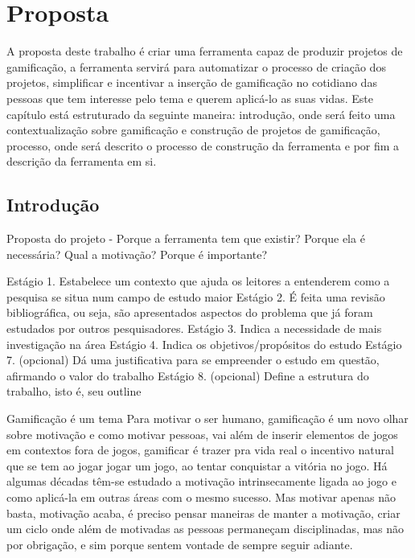 \chapter*[Proposta]{Proposta}


A proposta deste trabalho é criar uma ferramenta capaz de produzir projetos de gamificação, a ferramenta servirá para automatizar o processo de criação dos projetos, simplificar e incentivar a inserção de gamificação no cotidiano das pessoas que tem interesse pelo tema e querem aplicá-lo as suas vidas. Este capítulo está estruturado da seguinte maneira: introdução, onde será feito uma contextualização sobre gamificação e construção de projetos de gamificação, processo, onde será descrito o processo de construção da ferramenta e por fim a descrição da ferramenta em si.


\section{Introdução}


Proposta do projeto - Porque a ferramenta tem que existir?
Porque ela é necessária? Qual a motivação? Porque é importante?

Estágio 1. Estabelece um contexto que ajuda os leitores a entenderem como a
pesquisa se situa num campo de estudo maior
Estágio 2. É feita uma revisão bibliográfica, ou seja, são apresentados aspectos do
problema que já foram estudados por outros pesquisadores.
Estágio 3. Indica a necessidade de mais investigação na área
Estágio 4. Indica os objetivos/propósitos do estudo
Estágio 7. (opcional) Dá uma justificativa para se empreender o estudo em questão,
afirmando o valor do trabalho
Estágio 8. (opcional) Define a estrutura do trabalho, isto é, seu outline


Gamificação é um tema Para motivar o ser humano, gamificação é um novo olhar sobre motivação e como motivar pessoas, vai além de inserir elementos de jogos em contextos fora de jogos, gamificar é trazer pra vida real o incentivo natural que se tem ao jogar jogar um jogo, ao tentar conquistar a vitória no jogo. Há algumas décadas têm-se estudado a motivação intrinsecamente ligada ao jogo e como aplicá-la em outras áreas com o mesmo sucesso. Mas motivar apenas não basta, motivação acaba, é preciso pensar maneiras de manter a motivação, criar um ciclo onde além de motivadas as pessoas permaneçam disciplinadas, mas não por obrigação, e sim porque sentem vontade de sempre seguir adiante.

